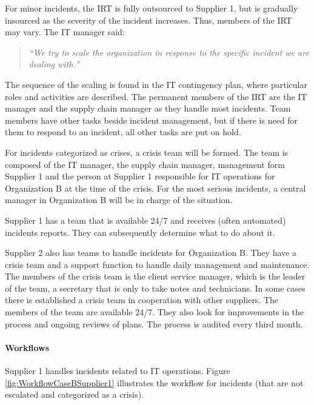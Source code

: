For minor incidents, the \ac{IRT} is fully outsourced to Supplier 1, but is gradually insourced as the severity of the incident increases. Thus, members of the \ac{IRT} may vary. The IT manager said:

\begin{quote}
\textit{``We try to scale the organization in response to the specific incident we are dealing with."}
\end{quote}

The sequence of the scaling is found in the IT contingency plan, where particular roles and activities are described. The permanent members of the \ac{IRT} are the IT manager and the supply chain manager as they handle most incidents. Team members have other tasks beside incident management, but if there is need for them to respond to an incident, all other tasks are put on hold.

For incidents categorized as crises, a crisis team will be formed. The team is composed of the IT manager, the supply chain manager, management form Supplier 1 and the person at Supplier 1 responsible for IT operations for Organization B at the time of the crisis. For the most serious incidents, a central manager in Organization B will be in charge of the situation.

Supplier 1 has a team that is available 24/7 and receives (often automated) incidents reports. They can subsequently determine what to do about it.

Supplier 2 also has teams to handle incidents for Organization B. They have a crisis team and a support function to handle daily management and maintenance. The members of the crisis team is the client service manager, which is the leader of the team, a secretary that is only to take notes and technicians. In some cases there is established a crisis team in cooperation with other suppliers. The members of the team are available 24/7. They also look for improvements in the process and ongoing reviews of plans. The process is audited every third month.

\paragraph{Workflows}

Supplier 1 handles incidents related to IT operations. Figure \ref{fig:WorkflowCaseBSupplier1} illustrates the workflow for incidents (that are not escalated and categorized as a crisis).

